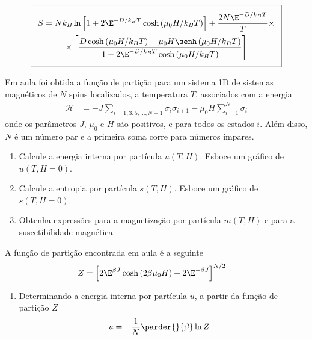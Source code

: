 \begin{prob}
\begin{sol}
\begin{enumerate}[label=\alph *)]
\begin{align}
        \addtolength{\fboxsep}{5pt}
         \boxed{
         \begin{gathered}
          S=Nk_B\ln\left[1+2\E^{-D/k_BT}\cosh\left(\mu_0H/k_BT\right)\right]+\frac{2N\E^{-D/k_BT}}{T}\times\\
          \times\left[\frac{D\cosh\left(\mu_0H/k_BT\right)-\mu_0H\senh\left(\mu_0H/k_BT\right)}{1-2\E^{-D/k_BT}\cosh\left(\mu_0H/k_BT\right)}\right]        
         \end{gathered}
         }
      \end{align}
    \end{enumerate}  
  \end{sol}
\end{prob}
\begin{prob}
  Em aula foi obtida a função de partição para um sistema 1D de sistemas magnéticos de $N$ spins localizados, a temperatura $T$, associados com a energia
  \begin{align}
    \mathcal{H}&=-J\sum_{i=1,3,5,...,N-1}\sigma_i\sigma_{i+1}-\mu_0H\sum_{i=1}^N\sigma_i
  \end{align}
  onde os parâmetros $J$, $\mu_0$ e $H$ são positivos, e para todos os estados $i$. Além disso, $N$ é um número par e a primeira soma corre para números ímpares.
  \begin{enumerate}[label=\alph *)]
    \item Calcule a energia interna por partícula $u(T,H)$. Esboce um gráfico de $u(T,H=0)$.
    \item Calcule a entropia por partícula $s(T,H)$. Esboce um gráfico de $s(T,H=0)$.
    \item Obtenha expressões para a magnetização por partícula $m(T,H)$ e para a suscetibilidade magnética
  \end{enumerate}
  \begin{sol}
    A função de partição encontrada em aula é a seguinte
    \begin{align}
     Z&=\left[2\E^{\beta J}\cosh\left(2\beta\mu_0H\right)+2\E^{-\beta J}\right]^{N/2}
    \end{align}
    \begin{enumerate}[label=\alph *)]
      \item Determinando a energia interna por partícula $u$, a partir da função de partição $Z$
      \begin{align}
        u&=-\frac{1}{N}\parder{}{\beta}\ln Z
      \end{align}

\end{enumerate}
\end{sol}
\end{prob}
